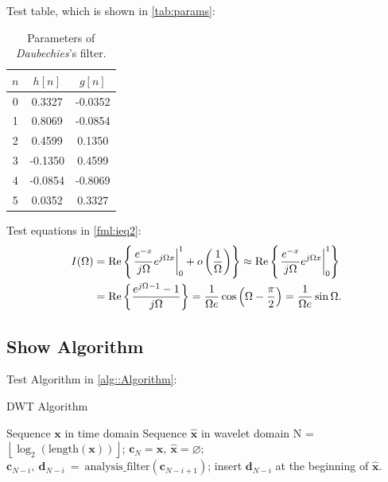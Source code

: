 \documentclass[mainfont=Palatino,color]{IEEERev} %
\begin{document}
Test table, which is shown in \autoref{tab:params}:

\begin{table}[htbp]
  \centering
  \normalsize
  \caption[Parameters of Daubechies's filter.]{Parameters of \textit{Daubechies}'s filter.}
  \label{tab:params}
  \begin{tabular}{|c|c|c|}
    \hline
    $n$ & $h[n]$ & $g[n]$ \\ \hline
    0 &  0.3327 & -0.0352 \\ \hline
    1 &  0.8069 & -0.0854 \\ \hline
    2 &  0.4599 &  0.1350 \\ \hline
    3 & -0.1350 &  0.4599 \\ \hline
    4 & -0.0854 & -0.8069 \\ \hline
    5 &  0.0352 &  0.3327 \\ \hline
  \end{tabular}
\end{table}

Test equations in \eqref{fml:ieq2}:
\begin{equation} \label{fml:ieq2}
  \begin{aligned}
    I (\Omega) &= \tRe{ \left. \frac{e^{-x}}{j \Omega} e^{j \Omega x} \right|_0^1 + o\left( \frac{1}{\Omega} \right) } \approx \tRe{ \left. \frac{e^{-x}}{j \Omega} e^{j \Omega x} \right|_0^1 } \\
    &= \tRe{ \frac{e^{j\Omega-1} - 1}{j \Omega} } = \frac{1}{\Omega e} \cos \left( \Omega - \frac{\pi}{2} \right) = \frac{1}{\Omega e} \sin \Omega. 
  \end{aligned}
\end{equation}

\subsection{Show Algorithm}

Test Algorithm in \autoref{alg::Algorithm}:

\begin{algorithm}[htbp]
  \caption{DWT Algorithm}
  \label{alg::Algorithm}
  \begin{algorithmic}[1]
    \REQUIRE Sequence $\mathbf{x}$ in time domain
    \ENSURE Sequence $\hat{\mathbf{x}}$ in wavelet domain
    \STATE N = $\left\lfloor \log_2 (\mathrm{length}(\mathbf{x})) \right\rfloor$;
    \STATE $\mathbf{c}_{N} = \mathbf{x},~ \hat{\mathbf{x}} = \varnothing$;
      \STATE $\mathbf{c}_{N-i},~\mathbf{d}_{N-i}~=~\mathrm{analysis\_filter}(\mathbf{c}_{N-i+1})$;
      \STATE insert $\mathbf{d}_{N-i}$ at the beginning of $\hat{\mathbf{x}}$.
    \ENDFOR
  \end{algorithmic}
\end{algorithm}
    
\end{document}
